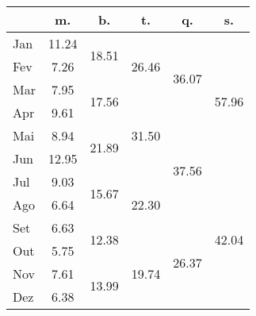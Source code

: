 \begin{center}
\begin{tabular}{| l || c | c | c | c | c |}\hline
 & m. & b. & t. & q. & s. \\\hline
Jan & \multirow{1}{*}{ 11.24 }  & \multirow{2}{*}{ 18.51 }  & \multirow{3}{*}{ 26.46 }  & \multirow{4}{*}{ 36.07 }  & \multirow{6}{*}{ 57.96 }  \\\cline{2-2}
Fev & \multirow{1}{*}{ 7.26 }  & & & & \\\cline{2-2}\cline{3-3}
Mar & \multirow{1}{*}{ 7.95 }  & \multirow{2}{*}{ 17.56 }  & & & \\\cline{2-2}\cline{4-4}
Apr & \multirow{1}{*}{ 9.61 }  & & \multirow{3}{*}{ 31.50 }  & & \\\cline{2-2}\cline{3-3}\cline{5-5}
Mai & \multirow{1}{*}{ 8.94 }  & \multirow{2}{*}{ 21.89 }  & & \multirow{4}{*}{ 37.56 }  & \\\cline{2-2}
Jun & \multirow{1}{*}{ 12.95 }  & & & & \\\cline{2-2}\cline{3-3}\cline{4-4}\cline{6-6}
Jul & \multirow{1}{*}{ 9.03 }  & \multirow{2}{*}{ 15.67 }  & \multirow{3}{*}{ 22.30 }  & & \multirow{6}{*}{ 42.04 }  \\\cline{2-2}
Ago & \multirow{1}{*}{ 6.64 }  & & & & \\\cline{2-2}\cline{3-3}\cline{5-5}
Set & \multirow{1}{*}{ 6.63 }  & \multirow{2}{*}{ 12.38 }  & & \multirow{4}{*}{ 26.37 }  & \\\cline{2-2}\cline{4-4}
Out & \multirow{1}{*}{ 5.75 }  & & \multirow{3}{*}{ 19.74 }  & & \\\cline{2-2}\cline{3-3}
Nov & \multirow{1}{*}{ 7.61 }  & \multirow{2}{*}{ 13.99 }  & & & \\\cline{2-2}
Dez & \multirow{1}{*}{ 6.38 }  & & & & \\\cline{2-2}\cline{3-3}\cline{4-4}\cline{5-5}\cline{6-6}
\hline\end{tabular}
\end{center}